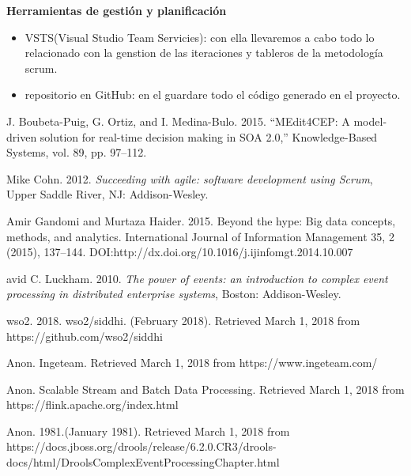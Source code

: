 \documentclass[a4paper]{article}
\begin{document}
\textbf{Herramientas de gestión y planificación}
\begin{itemize}
\item VSTS(Visual Studio Team Servicies): con ella llevaremos a cabo todo lo relacionado con la genstion de las iteraciones y tableros de la metodología scrum.
\item repositorio en GitHub: en el guardare todo el código generado en el proyecto.
\end{itemize}



\begin{thebibliography}{9}

J. Boubeta-Puig, G. Ortiz, and I. Medina-Bulo. 2015. “MEdit4CEP: A model-driven solution for real-time decision making in SOA 2.0,” Knowledge-Based Systems, vol. 89, pp. 97–112.

Mike Cohn. 2012. \textit{Succeeding with agile: software development using Scrum}, Upper Saddle River, NJ: Addison-Wesley.

Amir Gandomi and Murtaza Haider. 2015. Beyond the hype: Big data concepts, methods, and analytics. International Journal of Information Management 35, 2 (2015), 137–144. DOI:http://dx.doi.org/10.1016/j.ijinfomgt.2014.10.007 

avid C. Luckham. 2010. \textit{The power of events: an introduction to complex event processing in distributed enterprise systems}, Boston: Addison-Wesley.

wso2. 2018. wso2/siddhi. (February 2018). Retrieved March 1, 2018 from https://github.com/wso2/siddhi

Anon. Ingeteam. Retrieved March 1, 2018 from https://www.ingeteam.com/ 

Anon. Scalable Stream and Batch Data Processing. Retrieved March 1, 2018 from https://flink.apache.org/index.html

Anon. 1981.(January 1981). Retrieved March 1, 2018 from https://docs.jboss.org/drools/release/6.2.0.CR3/drools-docs/html/DroolsComplexEventProcessingChapter.html 


\end{thebibliography}
\end{document}
